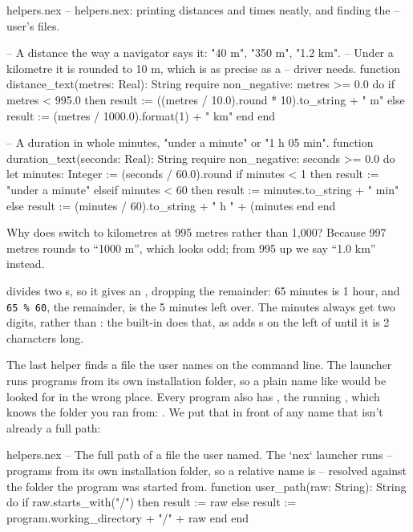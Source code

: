 \begin{newfile}{helpers.nex}
-- helpers.nex: printing distances and times neatly, and finding the
-- user's files.

-- A distance the way a navigator says it: "40 m", "350 m", "1.2 km".
-- Under a kilometre it is rounded to 10 m, which is as precise as a
-- driver needs.
function distance_text(metres: Real): String
require
  non_negative: metres >= 0.0
do
  if metres < 995.0 then
    result := ((metres / 10.0).round * 10).to_string + " m"
  else
    result := (metres / 1000.0).format(1) + " km"
  end
end

-- A duration in whole minutes, "under a minute" or "1 h 05 min".
function duration_text(seconds: Real): String
require
  non_negative: seconds >= 0.0
do
  let minutes: Integer := (seconds / 60.0).round
  if minutes < 1 then
    result := "under a minute"
  elseif minutes < 60 then
    result := minutes.to_string + " min"
  else
    result := (minutes / 60).to_string + " h "
      + (minutes %
  end
end
\end{newfile}

Why does  switch to kilometres at 995 metres rather
than 1,000? Because 997 metres rounds to ``1000 m'', which looks odd; from
995 up we say ``1.0 km'' instead.

 divides two s, so it gives an
, dropping the remainder: 65 minutes is 1 hour, and
\texttt{65~\%~60}, the remainder, is the 5 minutes left over. The minutes
always get two digits,  rather than : the built-in
 does that, as  adds s
on the left of  until it is 2 characters long.

The last helper finds a file the user names on the command line. The
 launcher runs programs from its own installation folder, so a
plain name like  would be looked for in the wrong
place. Every program also has , the running
, which knows the folder you ran  from:
. We put that in front of any name that
isn't already a full path:

\begin{append}{helpers.nex}
-- The full path of a file the user named. The `nex` launcher runs
-- programs from its own installation folder, so a relative name is
-- resolved against the folder the program was started from.
function user_path(raw: String): String do
  if raw.starts_with("/") then
    result := raw
  else
    result := program.working_directory + "/" + raw
  end
end
\end{append}

